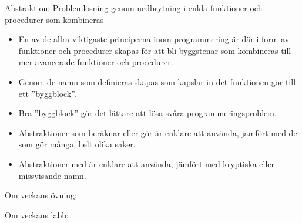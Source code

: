 \begin{Slide}{Abstraktion: Problemlösning genom nedbrytning i enkla funktioner och procedurer som kombineras}\SlideFontSmall
\begin{itemize}
\item En av de allra viktigaste principerna inom programmering är  där   i form av funktioner och procedurer skapas för att bli byggstenar som kombineras till mer avancerade funktioner och procedurer.

\item Genom de namn som definieras skapas  som kapslar in det funktionen gör till ett ''byggblock''.

\item Bra ''byggblock'' gör det lättare att lösa svåra programmeringsproblem.

\item Abstraktioner som beräknar eller gör  är enklare att använda, jämfört med de som gör många, helt olika saker.

\item Abstraktioner med  är enklare att använda, jämfört med kryptiska eller missvisande namn.
\end{itemize}

\end{Slide}

\ifkompendium\else

\begin{Slide}{Om veckans övning: }\SlideFontSmall

\begin{itemize}

\end{itemize}

\end{Slide}

\begin{Slide}{Om veckans labb: }
\begin{itemize}

\end{itemize}
\end{Slide}

\fi

